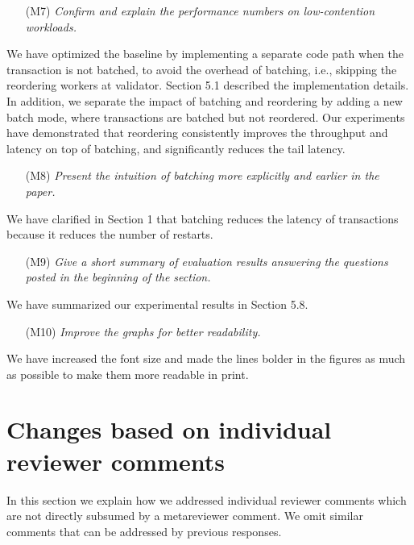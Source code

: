 \documentclass{article}
\begin{document}
\begin{itemize}
\item[(M7)] \emph{Confirm and explain the performance numbers on low-contention workloads.}
\end{itemize}
\vspace{-1em}
We have optimized the baseline by implementing a separate code path when the transaction is not batched, to avoid the overhead of batching, i.e., skipping the reordering workers at validator. Section 5.1 described the implementation details. In addition, we separate the impact of batching and reordering by adding a new batch mode, where transactions are batched but not reordered. Our experiments have demonstrated that reordering consistently improves the throughput and latency on top of batching, and significantly reduces the tail latency.

\begin{itemize}
\item[(M8)] \emph{Present the intuition of batching more explicitly and earlier in the paper. }
\end{itemize}
\vspace{-1em}
We have clarified in Section 1 that batching reduces the latency of transactions because it reduces the number of restarts.

\begin{itemize}
\item[(M9)] \emph{Give a short summary of evaluation results answering the questions posted in the beginning of the section.}
\end{itemize}
\vspace{-1em}
We have summarized our experimental results in Section 5.8.

\begin{itemize}
\item[(M10)] \emph{Improve the graphs for better readability.}
\end{itemize}
\vspace{-1em}
We have increased the font size and made the lines bolder in the figures as much as possible to make them more readable in print.

\section{Changes based on individual reviewer comments}

In this section we explain how we addressed individual reviewer comments which are not directly subsumed by a metareviewer comment. We omit similar comments that can be addressed by previous responses.
\end{document}
